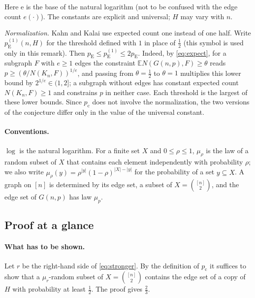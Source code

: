 \documentclass[11pt]{article}
\numberwithin{equation}{section}
\newcommand{\EE}{\mathbb E}
\newcommand{\pc}{p_{\mathrm c}}
\newcommand{\pE}{p_{\mathrm E}}
\newcommand{\ee}{\mathrm e}
\begin{document}
Here $\ee$ is the base of the natural logarithm (not to be confused with
the edge count $e(\cdot)$). The constants are explicit and universal;
$H$ may vary with $n$.

\emph{Normalization.} Kahn and Kalai use expected count one instead of
one half. Write $\pE^{(1)}(n,H)$ for the threshold defined with $1$ in
place of $\frac12$ (this symbol is used only in this remark). Then
$\pE\le\pE^{(1)}\le2\pE$. Indeed, by \eqref{eq:expect}, for a subgraph
$F$ with $e\ge1$ edges the constraint $\EE N(G(n,p),F)\ge\theta$ reads
$p\ge(\theta/N(K_n,F))^{1/e}$, and passing from $\theta=\frac12$ to
$\theta=1$ multiplies this lower bound by $2^{1/e}\in(1,2]$; a subgraph
without edges has constant expected count $N(K_n,F)\ge1$ and constrains
$p$ in neither case. Each threshold is the largest of these lower
bounds. Since $\pc$ does not involve the normalization, the two
versions of the conjecture differ only in the value of the universal
constant.

\paragraph{Conventions.}
$\log$ is the natural logarithm. For a finite set $X$ and
$0\le\rho\le1$, $\mu_\rho$ is the law of a random subset of $X$ that
contains each element independently with probability $\rho$; we also
write $\mu_\rho(y)=\rho^{|y|}(1-\rho)^{|X|-|y|}$ for the probability of
a set $y\subseteq X$. A graph on $[n]$ is determined by its edge set, a
subset of $X=\binom{[n]}2$, and the edge set of $G(n,p)$ has law $\mu_p$.

\subsection{Proof at a glance}\label{sec:glance}

\paragraph{What has to be shown.}
Let $r$ be the right-hand side of \eqref{eq:stronger}. By the definition
of $\pc$ it suffices to show that a $\mu_r$-random subset of
$X=\binom{[n]}2$ contains the edge set of a copy of $H$ with probability
at least $\frac12$. The proof gives $\frac23$.
\end{document}
